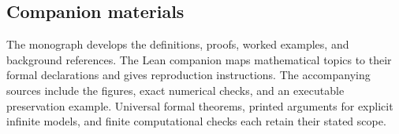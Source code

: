 \documentclass[11pt]{article}
\begin{document}
\subsection*{Companion materials}
The monograph develops the definitions, proofs, worked examples, and background references. The Lean companion maps mathematical topics to their formal declarations and gives reproduction instructions. The accompanying sources include the figures, exact numerical checks, and an executable preservation example. Universal formal theorems, printed arguments for explicit infinite models, and finite computational checks each retain their stated scope.
\end{document}
